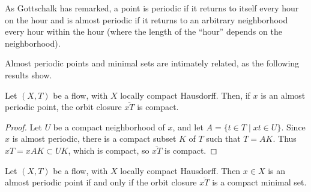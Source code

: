As Gottschalk has remarked, a point is periodic if it returns to itself every hour on the hour and is almost periodic if it returns to an arbitrary neighborhood every hour within the hour (where the length of the “hour” depends on the neighborhood).


Almost periodic points and minimal sets are intimately related, as the following results show.


\begin{lemma}
    Let $(X,T)$ be a flow, with $X$ locally compact Hausdorff. Then, if $x$ is an almost periodic point, the orbit closure $\overline{xT}$ is compact.
\end{lemma}

\begin{proof}
    Let $U$ be a compact neighborhood of $x$, and let $A = \{t \in T \mid xt \in U\}$. Since $x$ is almost periodic, there is a compact subset $K$ of $T$ such that $T = AK$. Thus $xT = xAK \subset UK$, which is compact, so $\overline{xT}$ is compact.
\end{proof}


\begin{theorem}
    \label{thm:ap_compact_minimal_orbit_closure}

    Let $(X,T)$ be a flow, with $X$ locally compact Hausdorff. Then $x \in X$ is an almost periodic point if and only if the orbit closure $\overline{xT}$ is a compact minimal set.
\end{theorem}

